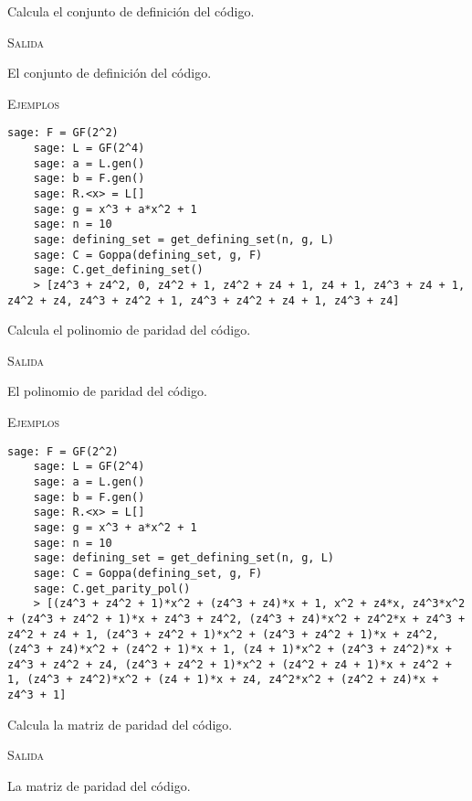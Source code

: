 \begin{description}[leftmargin=1em, font=\normalfont\ttfamily, style=nextline]
\begin{description}[font=\ttfamily, style=nextline]
  \item[get\_defining\_set(self)] Calcula el conjunto de definición del código.
  
  \textsc{Salida}
  \begin{description}[font=\normalfont\ttfamily]
    \item[] El conjunto de definición del código.
  \end{description}

  \textsc{Ejemplos}
  \begin{lstlisting}[gobble=4]
    sage: F = GF(2^2)
    sage: L = GF(2^4)
    sage: a = L.gen()
    sage: b = F.gen()
    sage: R.<x> = L[]
    sage: g = x^3 + a*x^2 + 1
    sage: n = 10
    sage: defining_set = get_defining_set(n, g, L)
    sage: C = Goppa(defining_set, g, F)
    sage: C.get_defining_set()
    > [z4^3 + z4^2, 0, z4^2 + 1, z4^2 + z4 + 1, z4 + 1, z4^3 + z4 + 1, z4^2 + z4, z4^3 + z4^2 + 1, z4^3 + z4^2 + z4 + 1, z4^3 + z4]
  \end{lstlisting}

  \item[get\_parity\_pol(self)] Calcula el polinomio de paridad del código.
  
  \textsc{Salida}
  \begin{description}[font=\normalfont\ttfamily]
    \item[] El polinomio de paridad del código.
  \end{description}

  \textsc{Ejemplos}
  \begin{lstlisting}[gobble=4]
    sage: F = GF(2^2)
    sage: L = GF(2^4)
    sage: a = L.gen()
    sage: b = F.gen()
    sage: R.<x> = L[]
    sage: g = x^3 + a*x^2 + 1
    sage: n = 10
    sage: defining_set = get_defining_set(n, g, L)
    sage: C = Goppa(defining_set, g, F)
    sage: C.get_parity_pol()
    > [(z4^3 + z4^2 + 1)*x^2 + (z4^3 + z4)*x + 1, x^2 + z4*x, z4^3*x^2 + (z4^3 + z4^2 + 1)*x + z4^3 + z4^2, (z4^3 + z4)*x^2 + z4^2*x + z4^3 + z4^2 + z4 + 1, (z4^3 + z4^2 + 1)*x^2 + (z4^3 + z4^2 + 1)*x + z4^2, (z4^3 + z4)*x^2 + (z4^2 + 1)*x + 1, (z4 + 1)*x^2 + (z4^3 + z4^2)*x + z4^3 + z4^2 + z4, (z4^3 + z4^2 + 1)*x^2 + (z4^2 + z4 + 1)*x + z4^2 + 1, (z4^3 + z4^2)*x^2 + (z4 + 1)*x + z4, z4^2*x^2 + (z4^2 + z4)*x + z4^3 + 1]
  \end{lstlisting}

  \item[get\_parity\_check\_matrix(self)] Calcula la matriz de paridad del código.
  
  \textsc{Salida}
  \begin{description}[font=\normalfont\ttfamily]
    \item[] La matriz de paridad del código.
  \end{description}


\end{description}
\end{description}
